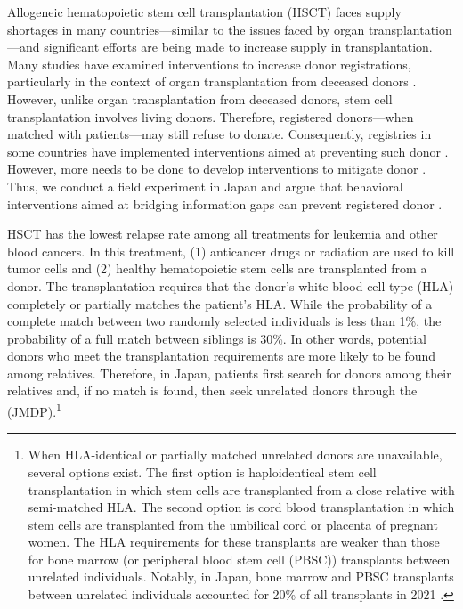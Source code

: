 \documentclass[12pt, a4paper]{article}
\newcommand{\revise}[1]{{\color{red}{#1}}}
\begin{document}
Allogeneic hematopoietic stem cell transplantation (HSCT) faces supply shortages in many countries---similar to the issues faced by organ transplantation---and significant efforts are being made to increase supply in transplantation. Many studies have examined interventions to increase donor registrations, particularly in the context of organ transplantation from deceased donors \citep[for example,][]{Kessler2012}. However, unlike organ transplantation from deceased donors, stem cell transplantation involves living donors. Therefore, registered donors---when matched with patients---may still refuse to donate. Consequently, registries in some countries have implemented interventions aimed at preventing such donor \revise{dropout} \citep{Switzer2018, Haylock2024}. However, more needs to be done to develop interventions to mitigate donor \revise{dropout}. Thus, we conduct a field experiment in Japan and argue that behavioral interventions aimed at bridging information gaps can prevent registered donor \revise{dropout}.

HSCT has the lowest relapse rate among all treatments for leukemia and other blood cancers. In this treatment, (1) anticancer drugs or radiation are used to kill tumor cells and (2) healthy hematopoietic stem cells are transplanted from a donor. The transplantation requires that the donor's white blood cell type (HLA) completely or partially matches the patient's HLA. While the probability of a complete match between two randomly selected individuals is less than 1\%, the probability of a full match between siblings is 30\%. In other words, potential donors who meet the transplantation requirements are more likely to be found among relatives. Therefore, in Japan, patients first search for donors among their relatives and, if no match is found, then seek unrelated donors through the \revise{Japan Marrow Donor Program} (JMDP).\footnote{When HLA-identical or partially matched unrelated donors are unavailable, several options exist. The first option is haploidentical stem cell transplantation in which stem cells are transplanted from a close relative with semi-matched HLA. The second option is cord blood transplantation in which stem cells are transplanted from the umbilical cord or placenta of pregnant women. The HLA requirements for these transplants are weaker than those for bone marrow (or peripheral blood stem cell (PBSC)) transplants between unrelated individuals. Notably, in Japan, bone marrow and PBSC transplants between unrelated individuals accounted for 20\% of all transplants in 2021 \citep{JapaneseDataCenterf2022}.}
\end{document}

